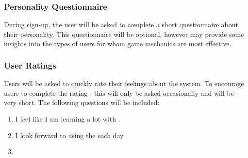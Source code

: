 \subsubsection{Personality Questionnaire}
During sign-up, the user will be asked to complete a short questionnaire about their personality. This questionnaire will be optional, however may provide some insights into the types of users for whom game mechanics are most effective. 

\subsubsection{User Ratings}
Users will be asked to quickly rate their feelings about the system. To encourage users to complete the rating - this will only be asked occasionally and will be very short. The following questions will be included:

\begin{enumerate}
    \item I feel like I am learning a lot with \SoftName.
    \item I look forward to using the \SoftName each day
    \item 

\end{enumerate}
